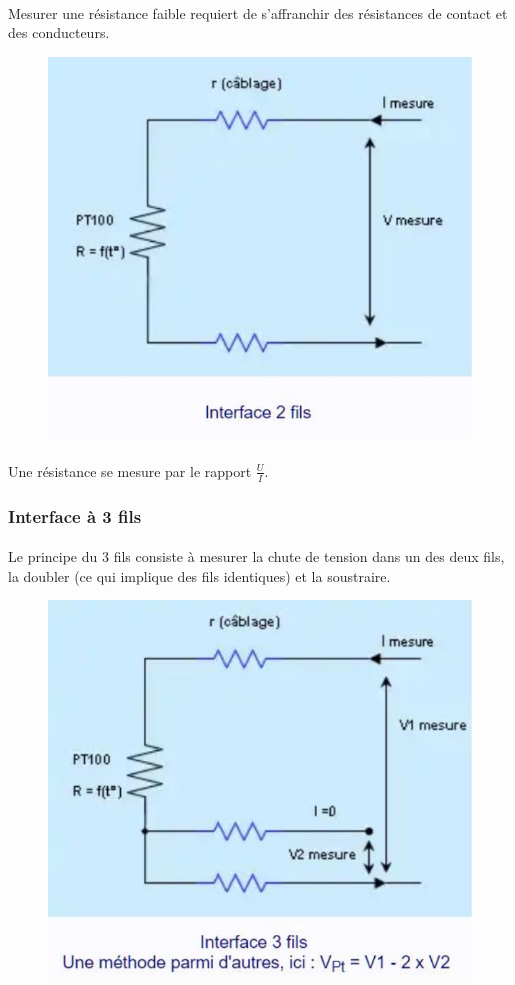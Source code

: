 \documentclass{article}
\begin{document}
\paragraph{}
Mesurer une résistance faible requiert de s'affranchir des résistances de contact et des conducteurs.

\begin{figure}[H]
    \centering
    \includegraphics[width=0.43\linewidth]{./images/2fils.png}
\end{figure}

\paragraph{}
Une résistance se mesure par le rapport $\frac{U}{I}$.

\subsubsection{Interface à 3 fils}
\paragraph{}
Le principe du 3 fils consiste à mesurer la chute de tension dans un des deux fils, la doubler (ce qui implique des fils identiques) et la soustraire.

\begin{figure}[H]
    \centering
    \includegraphics[width=0.43\linewidth]{./images/3fils.png}
\end{figure}
\end{document}
